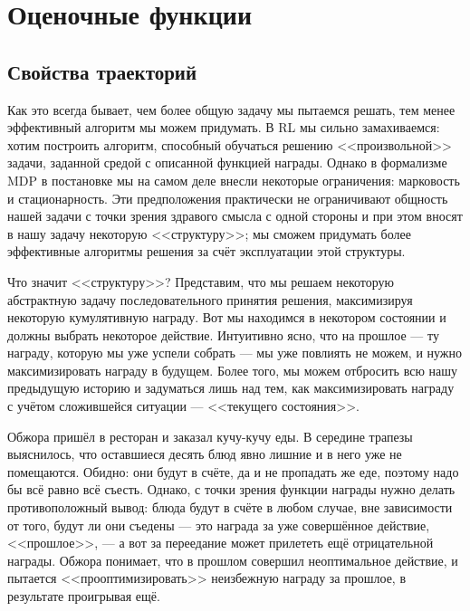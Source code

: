 \section{Оценочные функции}\label{valuefunctionssection}

\subsection{Свойства траекторий}

Как это всегда бывает, чем более общую задачу мы пытаемся решать, тем менее эффективный алгоритм мы можем придумать. В RL мы сильно замахиваемся: хотим построить алгоритм, способный обучаться решению <<произвольной>> задачи, заданной средой с описанной функцией награды. Однако в формализме MDP в постановке мы на самом деле внесли некоторые ограничения: марковость и стационарность. Эти предположения практически не ограничивают общность нашей задачи с точки зрения здравого смысла с одной стороны и при этом вносят в нашу задачу некоторую <<структуру>>; мы сможем придумать более эффективные алгоритмы решения за счёт эксплуатации этой структуры. 

Что значит <<структуру>>? Представим, что мы решаем некоторую абстрактную задачу последовательного принятия решения, максимизируя некоторую кумулятивную награду. Вот мы находимся в некотором состоянии и должны выбрать некоторое действие. Интуитивно ясно, что на прошлое --- ту награду, которую мы уже успели собрать --- мы уже повлиять не можем, и нужно максимизировать награду в будущем. Более того, мы можем отбросить всю нашу предыдущую историю и задуматься лишь над тем, как максимизировать награду с учётом сложившейся ситуации --- <<текущего состояния>>. 

\begin{example}
Обжора пришёл в ресторан и заказал кучу-кучу еды. В середине трапезы выяснилось, что оставшиеся десять блюд явно лишние и в него уже не помещаются. Обидно: они будут в счёте, да и не пропадать же еде, поэтому надо бы всё равно всё съесть. Однако, с точки зрения функции награды нужно делать противоположный вывод: блюда будут в счёте в любом случае, вне зависимости от того, будут ли они съедены --- это награда за уже совершённое действие, <<прошлое>>, --- а вот за переедание может прилететь ещё отрицательной награды. Обжора понимает, что в прошлом совершил неоптимальное действие, и пытается <<прооптимизировать>> неизбежную награду за прошлое, в результате проигрывая ещё.
\end{example}


